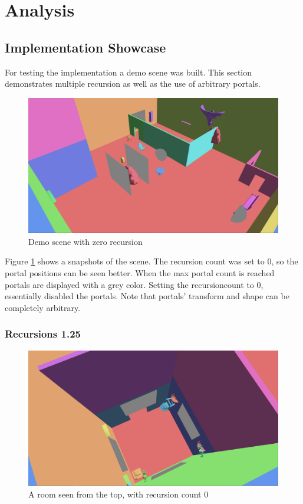 \section{Analysis}

\subsection{Implementation Showcase}

For testing the implementation a demo scene was built. This section demonstrates multiple recursion as well as the use of arbitrary portals.

\begin{figure}[H]
	\centering
	\includegraphics[width=\linewidth]{images/portals.png}
	\caption{Demo scene with zero recursion}
	\label{fig:demodisabled}
\end{figure}


Figure \ref{fig:demodisabled} shows a snapshots of the scene. The recursion count was set to 0,  so the portal positions can be seen better. When the max portal count is reached portals are displayed with a grey color. Setting the \gls{recursioncount} to 0, essentially disabled the portals. Note that portals' transform and shape can be completely arbitrary.

\subsubsection{Recursions 1.25}

\begin{figure}[H]
	\centering
	\includegraphics[width=\linewidth]{images/room.png}
	\caption{A room seen from the top, with recursion count 0}
	\label{fig:roomlayout}
\end{figure}

